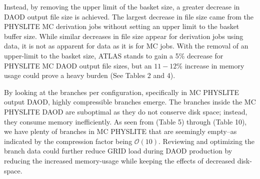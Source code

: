 Instead, by removing the upper limit of the basket size, a greater decrease in DAOD output file size is achieved. 
The largest decrease in file size came from the PHYSLITE MC derivation jobs without setting an upper limit to the basket buffer size. 
While similar decreases in file size appear for derivation jobs using data, it is not as apparent for data as it is for MC jobs. 
With the removal of an upper-limit to the basket size, ATLAS stands to gain a 5\% decrease for PHYSLITE MC DAOD output file sizes, but an $11 - 12$\% increase in memory usage could prove a heavy burden (See Tables 2 and 4).

By looking at the branches per configuration, specifically in MC PHYSLITE output DAOD, highly compressible branches emerge. 
The branches inside the MC PHYSLITE DAOD are suboptimal as they do not conserve disk space; instead, they consume memory inefficiently. 
As seen from (Table 5) through (Table 10), we have plenty of branches in MC PHYSLITE that are seemingly empty--as indicated by the compression factor being $\mathcal{O}(10)$. 
Reviewing and optimizing the branch data could further reduce GRID load during DAOD production by reducing the increased memory-usage while keeping the effects of decreased disk-space. 
